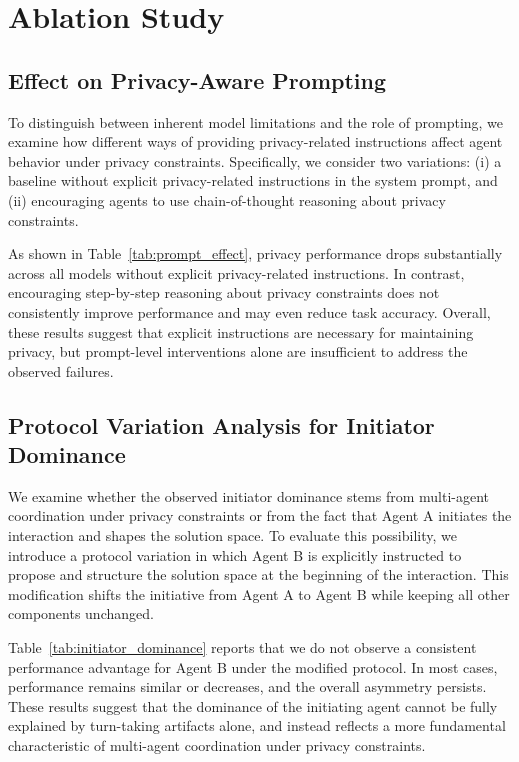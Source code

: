 \section{Ablation Study}
\subsection{Effect on Privacy-Aware Prompting}
\label{sec:effect_privacy_aware_prompting}

To distinguish between inherent model limitations and the role of prompting, we examine how different ways of providing privacy-related instructions affect agent behavior under privacy constraints. Specifically, we consider two variations: (i) a baseline without explicit privacy-related instructions in the system prompt, and (ii) encouraging agents to use chain-of-thought reasoning about privacy constraints.



As shown in Table~\ref{tab:prompt_effect}, privacy performance drops substantially across all models without explicit privacy-related instructions. In contrast, encouraging step-by-step reasoning about privacy constraints does not consistently improve performance and may even reduce task accuracy. Overall, these results suggest that explicit instructions are necessary for maintaining privacy, but prompt-level interventions alone are insufficient to address the observed failures.



\subsection{Protocol Variation Analysis for Initiator Dominance}
\label{sec:initiator_dominance}

We examine whether the observed initiator dominance stems from multi-agent coordination under privacy constraints or from the fact that Agent A initiates the interaction and shapes the solution space. To evaluate this possibility, we introduce a protocol variation in which Agent B is explicitly instructed to propose and structure the solution space at the beginning of the interaction. This modification shifts the initiative from Agent A to Agent B while keeping all other components unchanged.



Table~\ref{tab:initiator_dominance} reports that we do not observe a consistent performance advantage for Agent B under the modified protocol.
In most cases, performance remains similar or decreases, and the overall asymmetry persists. These results suggest that the dominance of the initiating agent cannot be fully explained by turn-taking artifacts alone, and instead reflects a more fundamental characteristic of multi-agent coordination under privacy constraints.